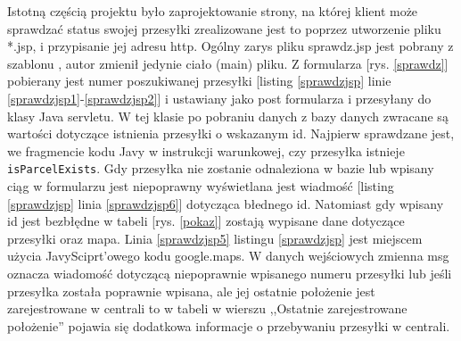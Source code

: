 \documentclass[eng,printmode,oneside]{mgr}
\begin{document}
Istotną częścią projektu było zaprojektowanie strony, na której
klient może sprawdzać status swojej przesyłki zrealizowane jest to poprzez utworzenie pliku
*.jsp, i przypisanie jej adresu http. Ogólny zarys pliku sprawdz.jsp jest
pobrany z szablonu \cite{szablon}, autor zmienił jedynie ciało (main) pliku. Z
formularza [rys. \ref{sprawdz}] pobierany jest numer poszukiwanej przesyłki
[listing \ref{sprawdzjsp} linie \ref{sprawdzjsp1}-\ref{sprawdzjsp2}] i ustawiany jako
post formularza i przesyłany do klasy Java servletu. W tej klasie po
pobraniu danych z bazy danych zwracane są wartości dotyczące istnienia przesyłki
o wskazanym id. Najpierw sprawdzane jest, we fragmencie kodu Javy w instrukcji
warunkowej, czy przesyłka istnieje \texttt{isParcelExists}. Gdy przesyłka
nie zostanie odnaleziona w bazie lub wpisany ciąg w formularzu jest niepoprawny
wyświetlana jest wiadmość [listing \ref{sprawdzjsp} linia \ref{sprawdzjsp6}]
dotycząca błednego id. Natomiast gdy wpisany id jest bezbłędne w tabeli [rys.
\ref{pokaz}] zostają wypisane dane dotyczące przesyłki oraz mapa. Linia \ref{sprawdzjsp5}
listingu \ref{sprawdzjsp} jest miejscem użycia JavySciprt'owego kodu
google.maps. W danych wejściowych zmienna msg oznacza wiadomość dotyczącą
niepoprawnie wpisanego numeru przesyłki lub jeśli przesyłka została poprawnie
wpisana, ale jej ostatnie położenie jest zarejestrowane w centrali to w tabeli
w wierszu ,,Ostatnie zarejestrowane położenie'' pojawia się dodatkowa informacje
o przebywaniu przesyłki w centrali.
\end{document}

